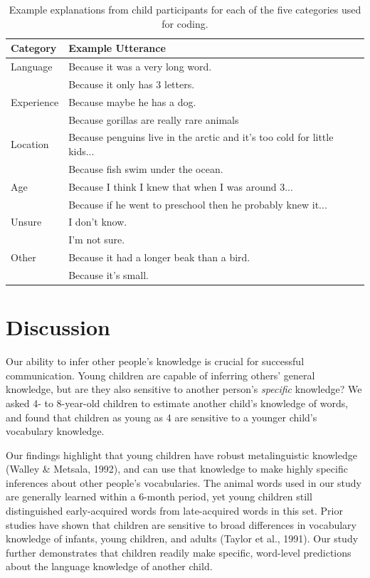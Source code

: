 \documentclass[10pt, letterpaper]{article}
\begin{document}
\begin{table}[tb]
\centering
\begin{tabular}{ll}
  \hline
Category & Example Utterance \\ 
  \hline
Language & Because it was a very long word. \\ 
    & Because it only has 3 letters. \\ 
  Experience & Because maybe he has a dog. \\ 
    & Because gorillas are really rare animals \\ 
  Location & Because penguins live in the arctic and it's too cold for little kids... \\ 
    & Because fish swim under the ocean. \\ 
  Age & Because I think I knew that when I was around 3... \\ 
    & Because if he went to preschool then he probably knew it... \\ 
  Unsure & I don't know. \\ 
    & I'm not sure. \\ 
  Other & Because it had a longer beak than a bird. \\ 
    & Because it's small. \\ 
   \hline
\end{tabular}
\caption{Example explanations from child participants for each of the five categories used for coding.} 
\label{tab:explanations_table}
\end{table}

\hypertarget{discussion}{%
\section{Discussion}\label{discussion}}

Our ability to infer other people's knowledge is crucial for successful
communication. Young children are capable of inferring others' general
knowledge, but are they also sensitive to another person's
\emph{specific} knowledge? We asked 4- to 8-year-old children to
estimate another child's knowledge of words, and found that children as
young as 4 are sensitive to a younger child's vocabulary knowledge.

Our findings highlight that young children have robust metalinguistic
knowledge (Walley \& Metsala, 1992), and can use that knowledge to make
highly specific inferences about other people's vocabularies. The animal
words used in our study are generally learned within a 6-month period,
yet young children still distinguished early-acquired words from
late-acquired words in this set. Prior studies have shown that children
are sensitive to broad differences in vocabulary knowledge of infants,
young children, and adults (Taylor et al., 1991). Our study further
demonstrates that children readily make specific, word-level predictions
about the language knowledge of another child.
\end{document}
